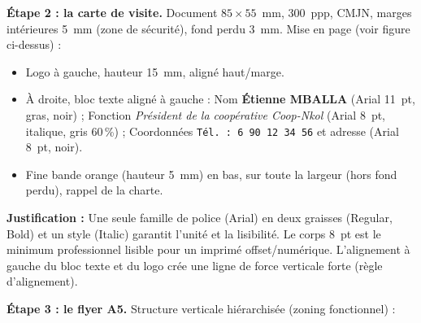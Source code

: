 \documentclass[11pt]{article}
\newcommand{\cle}[1]{{\popxbold\color{popdark}#1}}
\begin{document}
\begin{exoresolu}
\textbf{Étape 2 : la carte de visite.}
Document $85 \times 55$~mm, 300~ppp, CMJN, marges intérieures 5~mm (zone de sécurité), fond perdu 3~mm.
Mise en page (voir figure ci-dessus) :
\begin{itemize}
  \item Logo à gauche, hauteur 15~mm, aligné haut/marge.
  \item À droite, bloc texte aligné à gauche : Nom \textbf{Étienne MBALLA} (Arial 11~pt, gras, noir) ; Fonction \textit{Président de la coopérative Coop-Nkol} (Arial 8~pt, italique, gris 60\,\%) ; Coordonnées \texttt{Tél. : 6 90 12 34 56} et adresse (Arial 8~pt, noir).
  \item Fine bande orange (hauteur 5~mm) en bas, sur toute la largeur (hors fond perdu), rappel de la charte.
\end{itemize}
\textbf{Justification :} Une seule famille de police (Arial) en deux graisses (Regular, Bold) et un style (Italic) garantit l'unité et la lisibilité. Le corps 8~pt est le minimum professionnel lisible pour un imprimé offset/numérique. L'alignement à gauche du bloc texte et du logo crée une ligne de force verticale forte (règle d'\cle{alignement}).

\textbf{Étape 3 : le flyer A5.}
Structure verticale hiérarchisée (zoning fonctionnel) :


\end{exoresolu}
\end{document}
